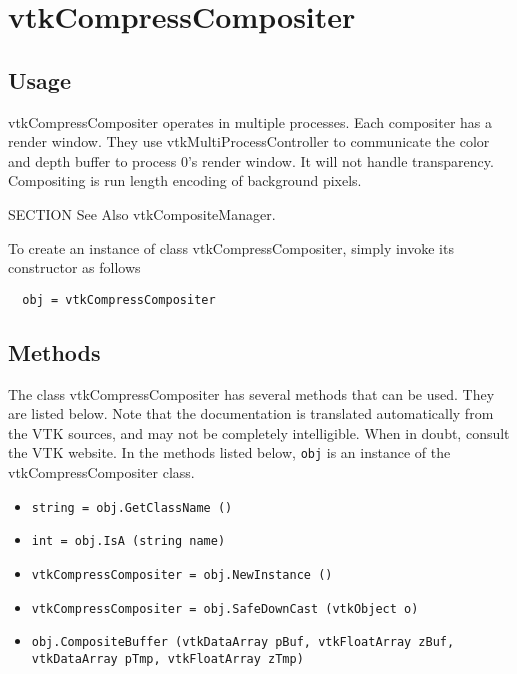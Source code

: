 \section{vtkCompressCompositer}

\subsection{Usage}

 vtkCompressCompositer operates in multiple processes.  Each compositer has 
 a render window.  They use vtkMultiProcessController to communicate 
 the color and depth buffer to process 0's render window.
 It will not handle transparency.  Compositing is run length encoding
 of background pixels.

 SECTION See Also
 vtkCompositeManager.

To create an instance of class vtkCompressCompositer, simply
invoke its constructor as follows
\begin{verbatim}
  obj = vtkCompressCompositer
\end{verbatim}
\subsection{Methods}

The class vtkCompressCompositer has several methods that can be used.
  They are listed below.
Note that the documentation is translated automatically from the VTK sources,
and may not be completely intelligible.  When in doubt, consult the VTK website.
In the methods listed below, \verb|obj| is an instance of the vtkCompressCompositer class.
\begin{itemize}
\item  \verb|string = obj.GetClassName ()|

\item  \verb|int = obj.IsA (string name)|

\item  \verb|vtkCompressCompositer = obj.NewInstance ()|

\item  \verb|vtkCompressCompositer = obj.SafeDownCast (vtkObject o)|

\item  \verb|obj.CompositeBuffer (vtkDataArray pBuf, vtkFloatArray zBuf, vtkDataArray pTmp, vtkFloatArray zTmp)|

\end{itemize}

